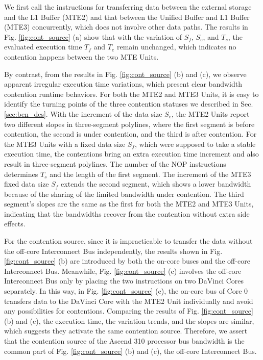 We first call the instructions for transferring data between the external storage and the L1 Buffer (MTE2) and that between the Unified Buffer and L1 Buffer (MTE3) concurrently, which does not involve other data paths. The results in Fig. \ref{fig:cont_source} (a) show that with the variation of $S_f$, $S_e$, and $T_s$, the evaluated execution time $T_f$ and $T_e$ remain unchanged, which indicates no contention happens between the two MTE Units.

By contrast, from the results in Fig. \ref{fig:cont_source} (b) and (c), we observe apparent irregular execution time variations, which present clear bandwidth contention runtime behaviors. For both the MTE2 and MTE3 Units, it is easy to identify the turning points of the three contention statuses we described in Sec. \ref{sec:ben_des}. With the increment of the data size $S_e$, the MTE2 Units report two different slopes in three-segment polylines, where the first segment is before contention, the second is under contention, and the third is after contention. For the MTE3 Units with a fixed data size $S_f$, which were supposed to take a stable execution time, the contentions bring an extra execution time increment and also result in three-segment polylines. The number of the NOP instructions determines $T_s$ and the length of the first segment. The increment of the MTE3 fixed data size $S_f$ extends the second segment, which shows a lower bandwidth because of the sharing of the limited bandwidth under contention. The third segment's slopes are the same as the first for both the MTE2 and MTE3 Units, indicating that the bandwidths recover from the contention without extra side effects.

For the contention source, since it is impracticable to transfer the data without the off-core Interconnect Bus independently, the results shown in Fig. \ref{fig:cont_source} (b) are introduced by both the on-core buses and the off-core Interconnect Bus. Meanwhile, Fig. \ref{fig:cont_source} (c) involves the off-core Interconnect Bus only by placing the two instructions on two DaVinci Cores separately. In this way, in Fig. \ref{fig:cont_source} (c), the on-core bus of Core 0 transfers data to the DaVinci Core with the MTE2 Unit individually and avoid any possibilities for contentions. Comparing the results of Fig. \ref{fig:cont_source} (b) and (c), the execution time, the variation trends, and the slopes are similar, which suggests they activate the same contention source. Therefore, we assert that the contention source of the Ascend 310 processor bus bandwidth is the common part of Fig. \ref{fig:cont_source} (b) and (c), the off-core Interconnect Bus.

